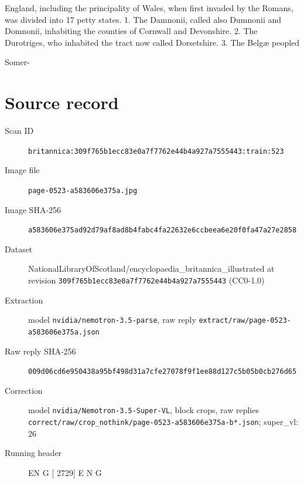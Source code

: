 \documentclass{article}
\begin{document}
England, including the principality of Wales, when first invaded by the Romans, was divided into 17 petty states. 1. The Damnonii, called also Dumnonii and Domnonii, inhabiting the counties of Cornwall and Devonshire. 2. The Durotriges, who inhabited the tract now called Dorsetshire. 3. The Belgæ peopled

Somer-


\section*{Source record}
\begin{description}
\item[Scan ID] \texttt{britannica:309f765b1ecc83e0a7f7762e44b4a927a7555443:train:523}
\item[Image file] \texttt{page-0523-a583606e375a.jpg}
\item[Image SHA-256] \texttt{a583606e375ad92d79af8ad8b4fabc4fa22632e6ccbeea6e20f0fa47a27e2858}
\item[Dataset] NationalLibraryOfScotland/encyclopaedia\_britannica\_illustrated at revision \texttt{309f765b1ecc83e0a7f7762e44b4a927a7555443} (CC0-1.0)
\item[Extraction] model \texttt{nvidia/nemotron-3.5-parse}, raw reply \texttt{extract/raw/page-0523-a583606e375a.json}
\item[Raw reply SHA-256] \texttt{009d06cd6e950438a95bf498d31a7cfe27078f9f1ee88d127c5b05b0cb276d65}
\item[Correction] model \texttt{nvidia/Nemotron-3.5-Super-VL}, block crops, raw replies \texttt{correct/raw/crop\_nothink/page-0523-a583606e375a-b*.json}; super\_vl: 26
\item[Running header] EN G [ 2729] E N G
\end{description}
\end{document}
